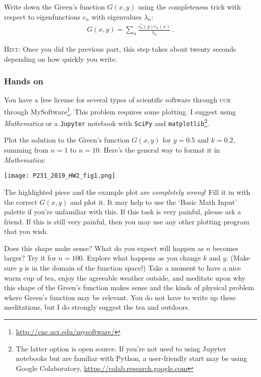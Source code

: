 \documentclass[12pt]{article}
\newcommand{\acro}[1]{\textsc{\MakeLowercase{#1}}}
\numberwithin{equation}{subsection}    %
\begin{document}
Write down the Green's function $G(x,y)$ using the completeness trick with respect to eigenfunctions $e_n$ with eigenvalues $\lambda_n$: 
\begin{align}
	G(x,y) = \sum_n \frac{e_n^*(y)e_n(x)}{\lambda_n} \ .
\end{align}

\textsc{Hint:} Once you did the previous part, this step takes about twenty seconds depending on how quickly you write.


\subsubsection{Hands on}

You have a free license for several types of scientific software 
through \acro{UCR} through MySoftware\footnote{\url{http://cnc.ucr.edu/mysoftware/}}. This problem requires some plotting. I suggest using \emph{Mathematica} or a \texttt{Jupyter} notebook with \texttt{SciPy} and \texttt{matplotlib}\footnote{The latter option is open source. If you're not used to using Jupyter notebooks but are familiar with Python, a user-friendly start may be using Google Colaboratory, \url{https://colab.research.google.com}}. 

Plot the solution to the Green's function $G(x,y)$ for $y = 0.5$ and $k = 0.2$, summing from $n=1$ to $n=10$. Here's the general way to format it in \emph{Mathematica}:
\begin{center}
	\texttt{[image: P231\_2019\_HW2\_fig1.png]}
\end{center}

The highlighted piece and the example plot are \emph{completely wrong}! Fill it in with the correct $G(x,y)$ and plot it. It may help to use the `Basic Math Input' palette if you're unfamiliar with this. If this task is very painful, please ask a friend. If this is still very painful, then you may use any other plotting program that you wish. 

Does this shape make sense? What do you expect will happen as $n$ becomes larger? Try it for $n=100$. Explore what happens as you change $k$ and $y$. (Make sure $y$ is in the domain of the function space!) Take a moment to have a nice warm cup of tea, enjoy the agreeable weather outside, and meditate upon why this shape of the Green's function makes sense and the kinds of physical problem where Green's function may be relevant. You do not have to write up these meditations, but I do strongly suggest the tea and outdoors.  
\end{document}
